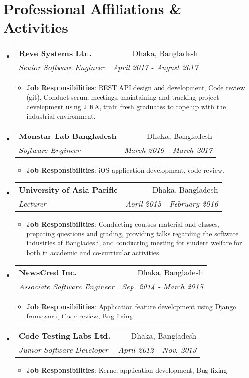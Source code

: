 \documentclass[letterpaper,11pt]{article}
\makeatletter
\newcommand{\resumeItem}[2]{
  \item\small{
    \textbf{#1}{: #2 \vspace{-2pt}}
  }
}
\newcommand{\resumeSubheading}[4]{
  \vspace{-1pt}\item
    \begin{tabular*}{0.97\textwidth}{l@{\extracolsep{\fill}}r}
      \textbf{#1} & #2 \\
      \textit{\small#3} & \textit{\small #4} \\
    \end{tabular*}\vspace{-5pt}
}
\newcommand{\resumeSubHeadingListStart}{\begin{itemize}[leftmargin=*]}
\newcommand{\resumeSubHeadingListEnd}{\end{itemize}}
\newcommand{\resumeItemListStart}{\begin{itemize}}
\newcommand{\resumeItemListEnd}{\end{itemize}\vspace{-5pt}}
\makeatother
\begin{document}
\section{Professional Affiliations \& Activities}
    \resumeSubHeadingListStart
        \resumeSubheading
            {Reve Systems Ltd.}
            {Dhaka, Bangladesh}
            {Senior Software Engineer}
            {April 2017 - August 2017}
            \resumeItemListStart
                \resumeItem
                    {Job Responsibilities}
                    {REST API design and development, Code review (git), Conduct scrum meetings, maintaining and tracking project development using JIRA, train fresh graduates to cope up with the industrial environment.}
            \resumeItemListEnd
        \resumeSubheading
            {Monstar Lab Bangladesh}
            {Dhaka, Bangladesh}
            {Software Engineer}
            {March 2016 - March 2017}
            \resumeItemListStart
                \resumeItem
                    {Job Responsibilities}
                    {iOS application development, code review.}
            \resumeItemListEnd
        \resumeSubheading
            {University of Asia Pacific}
            {Dhaka, Bangladesh}
            {Lecturer}
            { April 2015 - February 2016}
            \resumeItemListStart
                \resumeItem
                    {Job Responsibilities}
                    {Conducting courses material and classes, preparing questions and grading, providing talks regarding the software industries of Bangladesh, and conducting meeting for student welfare for both in academic and co-curricular activities.}%
            \resumeItemListEnd
        \resumeSubheading
            {NewsCred Inc.}
            {Dhaka, Bangladesh}
            {Associate Software Engineer}
            { Sep. 2014 - March 2015}
            \resumeItemListStart
                \resumeItem
                    {Job Responsibilities}
                    {Application feature development using Django framework, Code review, Bug fixing}
            \resumeItemListEnd
        \resumeSubheading
              {Code Testing Labs Ltd.}
              {Dhaka, Bangladesh}
              {Junior Software Developer}
              { April 2012 - Nov. 2013}
              \resumeItemListStart
                \resumeItem
                    {Job Responsibilities}
                    {Kernel application development, Bug fixing}
            \resumeItemListEnd
    \resumeSubHeadingListEnd
\end{document}

